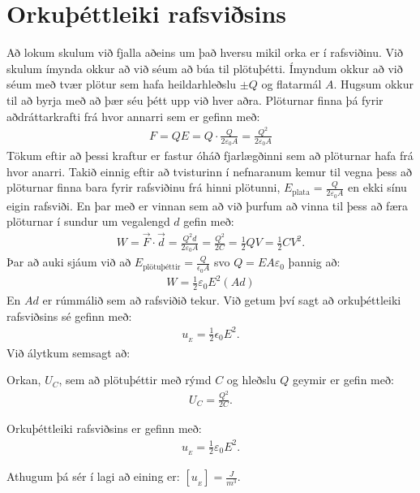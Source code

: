 \ifdefined \wholebook \else\documentclass[oneside]{book}\usepackage{EdlBook}\graphicspath{{figures/}}
\begin{document}
\newpage

\section{Orkuþéttleiki rafsviðsins}

Að lokum skulum við fjalla aðeins um það hversu mikil orka er í rafsviðinu. Við skulum ímynda okkur að við séum að búa til plötuþétti. Ímyndum okkur að við séum með tvær plötur sem hafa heildarhleðslu $\pm Q$ og flatarmál $A$. Hugsum okkur til að byrja með að þær séu þétt upp við hver aðra. Plöturnar finna þá fyrir aðdráttarkrafti frá hvor annarri sem er gefinn með:
\begin{align*}
    F = QE = Q \cdot \frac{Q}{2\varepsilon_0 A} = \frac{Q^2}{2 \varepsilon_0 A}
\end{align*}
Tökum eftir að þessi kraftur er fastur óháð fjarlægðinni sem að plöturnar hafa frá hvor anarri. Takið einnig eftir að tvisturinn í nefnaranum kemur til vegna þess að plöturnar finna bara fyrir rafsviðinu frá hinni plötunni, $E_{\text{plata}} = \frac{Q}{2\varepsilon_0 A}$ en ekki sínu eigin rafsviði. En þar með er vinnan sem að við þurfum að vinna til þess að færa plöturnar í sundur um vegalengd $d$ gefin með:
\begin{align*}
    W = \Vec{F} \cdot \Vec{d} = \frac{Q^2 d}{2 \varepsilon_0 A} = \frac{Q^2}{2C} = \frac{1}{2}QV  = \frac{1}{2}CV^2.
\end{align*}
Þar að auki sjáum við að $E_{\text{plötuþéttir}} = \frac{Q}{\epsilon_0 A}$ svo $Q = E A \varepsilon_0$ þannig að:
\begin{align*}
    W = \frac{1}{2} \varepsilon_0 E^2 \left(A d \right)
\end{align*}
En $Ad$ er rúmmálið sem að rafsviðið tekur. Við getum því sagt að orkuþéttleiki rafsviðsins sé gefinn með:
\begin{align*}
    u_{\!_E} = \frac{1}{2}\epsilon_0 E^2.
\end{align*}
Við álytkum semsagt að:

\begin{tcolorbox}
\begin{theorem}
Orkan, $U_C$, sem að plötuþéttir með rýmd $C$ og hleðslu $Q$ geymir er gefin með:
\begin{align*}
    U_C = \frac{Q^2}{2C}.
\end{align*}
\end{theorem}
\end{tcolorbox}


\begin{tcolorbox}
\begin{definition}
Orkuþéttleiki rafsviðsins er gefinn með:
\begin{align*}
    u_{\!_E} = \frac{1}{2}\varepsilon_0 E^2.
\end{align*}
\end{definition}
\end{tcolorbox}
Athugum þá sér í lagi að eining er: $\left[ u_{\!_E} \right] = \frac{\si{J}}{\si{m^3}}$.
\end{document}
